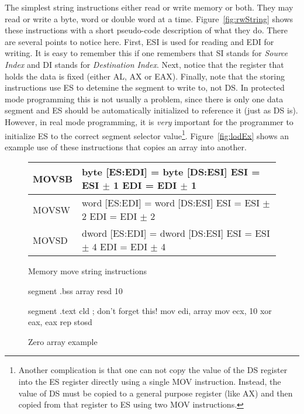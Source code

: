 The simplest string instructions either read or write memory or
both. They may read or write a byte, word or double word at a time.
Figure~\ref{fig:rwString} shows these instructions with a short
pseudo-code description of what they do. There are several points to
notice here. First, ESI is used for reading and EDI for writing. It is
easy to remember this if one remembers that SI stands for \emph{Source
Index} and DI stands for \emph{Destination
Index}.   Next, notice that
the register that holds the data is fixed (either AL, AX or
EAX). Finally, note that the storing instructions use ES to detemine
the segment to write to, not DS. In protected mode programming this is
not usually a problem, since there is only one data segment and ES
should be automatically initialized to reference it (just as DS
is). However, in real mode programming, it is \emph{very} important
for the programmer to initialize ES to the correct segment
 selector value\footnote{Another complication
is that one can not copy the value of the DS register into the ES
register directly using a single {\code MOV} instruction. Instead, the
value of DS must be copied to a general purpose register (like AX) and
then copied from that register to ES using two {\code MOV}
instructions.}. Figure~\ref{fig:lodEx} shows an example use of these
instructions that copies an array into another.

\begin{figure}[t]
\centering
{\code
\begin{tabular}{|lp{2.5in}|}
\hline
MOVSB & byte [ES:EDI] = byte [DS:ESI] \newline ESI = ESI $\pm$ 1 \newline
        EDI = EDI $\pm$ 1 \\
\hline
MOVSW & word [ES:EDI] = word [DS:ESI] \newline ESI = ESI $\pm$ 2 \newline
        EDI = EDI $\pm$ 2 \\
\hline
MOVSD & dword [ES:EDI] = dword [DS:ESI] \newline ESI = ESI $\pm$ 4 \newline
        EDI = EDI $\pm$ 4 \\
\hline
\end{tabular}
}
\caption{Memory move string instructions\label{fig:movString} 
          }
\end{figure}

\begin{figure}[t]
\begin{AsmCodeListing}[frame=single]
segment .bss
array  resd 10

segment .text
      cld                   ; don't forget this!
      mov    edi, array
      mov    ecx, 10
      xor    eax, eax
      rep stosd
\end{AsmCodeListing}
\caption{Zero array example\label{fig:zeroArrayEx}}
\end{figure}

